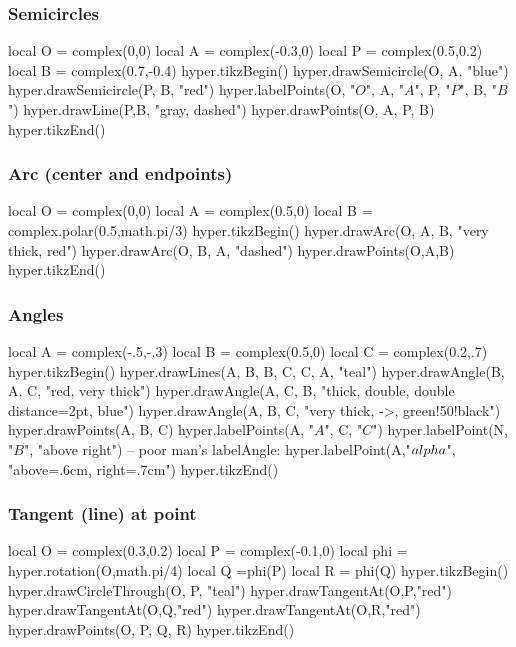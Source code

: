 \documentclass{article}
\begin{document}
\subsubsection{Semicircles}
\begin{codeandresult}
\begin{luacode*}
local O = complex(0,0)
local A = complex(-0.3,0)
local P = complex(0.5,0.2)
local B = complex(0.7,-0.4)
hyper.tikzBegin()
hyper.drawSemicircle(O, A, "blue")
hyper.drawSemicircle(P, B, "red")
hyper.labelPoints(O, "$O$", A, "$A$", P, "$P$", B, "$B$")
hyper.drawLine(P,B, "gray, dashed")
hyper.drawPoints(O, A, P, B)
hyper.tikzEnd()
\end{luacode*}
\end{codeandresult}


\subsubsection{Arc (center and endpoints)}
\begin{codeandresult}
\begin{luacode*}
local O = complex(0,0)
local A = complex(0.5,0)
local B = complex.polar(0.5,math.pi/3)
hyper.tikzBegin()
hyper.drawArc(O, A, B, "very thick, red")
hyper.drawArc(O, B, A, "dashed")
hyper.drawPoints(O,A,B)
hyper.tikzEnd()
\end{luacode*}
\end{codeandresult}

\subsubsection{Angles}
\begin{codeandresult}
\begin{luacode*}
local A = complex(-.5,-.3)
local B = complex(0.5,0)
local C = complex(0.2,.7)
hyper.tikzBegin()
hyper.drawLines(A, B, B, C, C, A, "teal")
hyper.drawAngle(B, A, C, "red, very thick")
hyper.drawAngle(A, C, B, "thick, double, double distance=2pt, blue")
hyper.drawAngle(A, B, C, "very thick, ->, green!50!black")
hyper.drawPoints(A, B, C)
hyper.labelPoints(A, "$A$", C, "$C$")
hyper.labelPoint(N, "$B$", "above right")
-- poor man's labelAngle:
hyper.labelPoint(A,"$\\alpha$", "above=.6cm, right=.7cm")
hyper.tikzEnd()
\end{luacode*}
\end{codeandresult}

\subsubsection{Tangent (line) at point}
\begin{codeandresult}
\begin{luacode*}
local O = complex(0.3,0.2)
local P = complex(-0.1,0)
local phi  =  hyper.rotation(O,math.pi/4)
local Q =phi(P)
local R = phi(Q)
hyper.tikzBegin()
hyper.drawCircleThrough(O, P, "teal")
hyper.drawTangentAt(O,P,"red")
hyper.drawTangentAt(O,Q,"red")
hyper.drawTangentAt(O,R,"red")
hyper.drawPoints(O, P, Q, R)
hyper.tikzEnd()
\end{luacode*}
\end{codeandresult}
\end{document}
